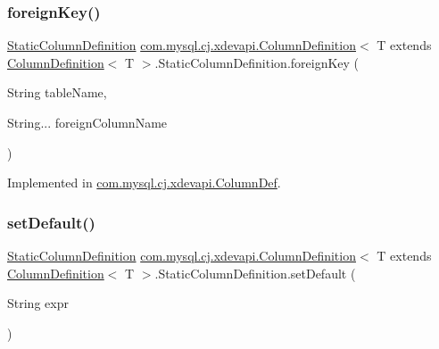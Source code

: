 \subsubsection{\texorpdfstring{foreign\+Key()}{foreignKey()}}
{\footnotesize\ttfamily \mbox{\hyperlink{interfacecom_1_1mysql_1_1cj_1_1xdevapi_1_1_column_definition_1_1_static_column_definition}{Static\+Column\+Definition}} \mbox{\hyperlink{interfacecom_1_1mysql_1_1cj_1_1protocol_1_1_column_definition}{com.\+mysql.\+cj.\+xdevapi.\+Column\+Definition}}$<$ T extends \mbox{\hyperlink{interfacecom_1_1mysql_1_1cj_1_1protocol_1_1_column_definition}{Column\+Definition}}$<$ T $>$.Static\+Column\+Definition.\+foreign\+Key (\begin{DoxyParamCaption}\item[{String}]{table\+Name,  }\item[{String...}]{foreign\+Column\+Name }\end{DoxyParamCaption})}



Implemented in \mbox{\hyperlink{classcom_1_1mysql_1_1cj_1_1xdevapi_1_1_column_def_a55fde7312a45fd6dc7bca76406c018cd}{com.\+mysql.\+cj.\+xdevapi.\+Column\+Def}}.

\mbox{\label{interfacecom_1_1mysql_1_1cj_1_1xdevapi_1_1_column_definition_1_1_static_column_definition_a0ac0436ab3288cb50a8dd10f4a9c8afc}} 
\subsubsection{\texorpdfstring{set\+Default()}{setDefault()}}
{\footnotesize\ttfamily \mbox{\hyperlink{interfacecom_1_1mysql_1_1cj_1_1xdevapi_1_1_column_definition_1_1_static_column_definition}{Static\+Column\+Definition}} \mbox{\hyperlink{interfacecom_1_1mysql_1_1cj_1_1protocol_1_1_column_definition}{com.\+mysql.\+cj.\+xdevapi.\+Column\+Definition}}$<$ T extends \mbox{\hyperlink{interfacecom_1_1mysql_1_1cj_1_1protocol_1_1_column_definition}{Column\+Definition}}$<$ T $>$.Static\+Column\+Definition.\+set\+Default (\begin{DoxyParamCaption}\item[{String}]{expr }\end{DoxyParamCaption})}



